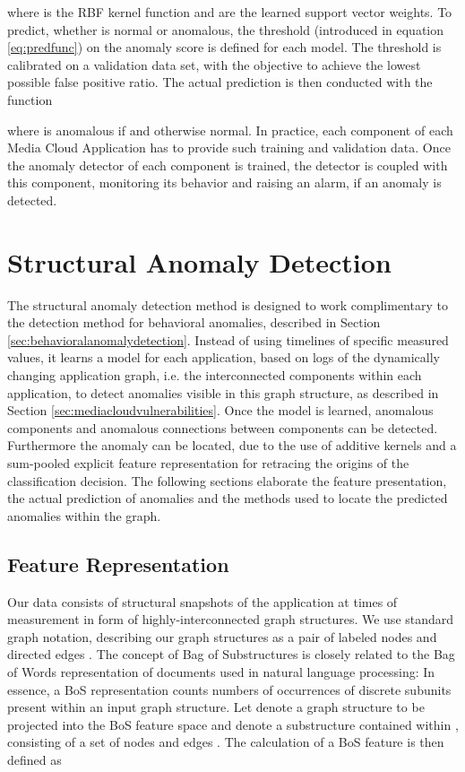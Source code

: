 \documentclass{llncs}
\begin{document}
where  is the RBF kernel function and  are the learned support vector weights.  
To predict, whether  is normal or anomalous, the threshold  (introduced in equation \eqref{eq:predfunc}) on the anomaly score is defined for each model. The threshold is calibrated on a validation data set, with the objective to achieve the lowest possible false positive ratio. The actual prediction  is then conducted with the function 

where  is anomalous if  and otherwise normal. In practice, each component of each Media Cloud Application has to provide such training and validation data. Once the anomaly detector of each component is trained, the detector is coupled with this component, monitoring its behavior and raising an alarm, if an anomaly is detected. \section{Structural Anomaly Detection}
\label{sec:structuralanomalydetection}
The structural anomaly detection method is designed to work complimentary to the detection method for behavioral anomalies, described in Section \ref{sec:behavioralanomalydetection}. Instead of using timelines of specific measured values, it learns a model for each application, based on logs of the dynamically changing application graph, i.e. the interconnected components within each application, to detect anomalies visible in this graph structure, as described in Section \ref{sec:mediacloudvulnerabilities}. Once the model is learned, anomalous components and anomalous connections between components can be detected. Furthermore the anomaly can be located, due to the use of additive kernels and a sum-pooled explicit feature representation for retracing the origins of the classification decision.
The following sections elaborate the feature presentation, the actual prediction of anomalies and the methods used to locate the predicted anomalies within the graph.


\subsection{Feature Representation}

Our data consists of structural snapshots of the application at times of measurement in form of highly-interconnected graph structures. We use standard graph notation, describing our graph structures  as a pair of labeled nodes  and directed edges .
The concept of Bag of Substructures is closely related to the Bag of Words representation of documents used in natural language processing: In essence, a BoS representation counts numbers of occurrences of discrete subunits present within an input graph structure. Let  denote a graph structure to be projected into the BoS feature space and  denote a substructure contained within , consisting of a set of nodes  and edges . The calculation of a BoS feature is then defined as
\end{document}
